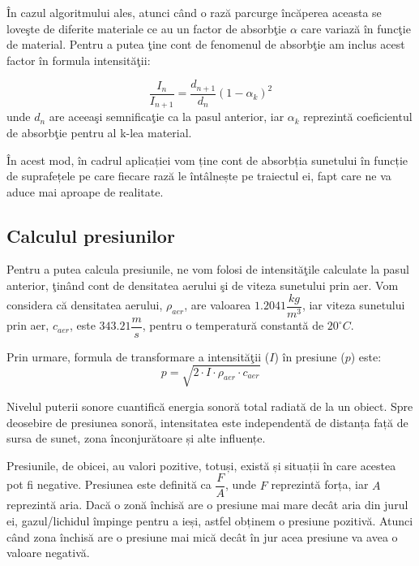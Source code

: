	
	\^{I}n cazul algoritmului ales, atunci c\^{a}nd o raz\u{a} parcurge \^{i}nc\u{a}perea aceasta se love\c{s}te de diferite materiale ce au un factor de absorb\c{t}ie $\alpha$ care variaz\u{a} \^{i}n func\c{t}ie de material. Pentru a putea \c{t}ine cont de fenomenul de absorb\c{t}ie am inclus acest factor \^{i}n formula intensit\u{a}\c{t}ii:
	
	\begin{equation}
		\frac{I_n}{I_{n+1}} = \frac{d_{n+1}}{d_n}(1-\alpha_k)^2
	\end{equation}
	unde $d_n$ are aceea\c{s}i semnifica\c{t}ie ca la pasul anterior, iar $\alpha_k$ reprezint\u{a} coeficientul de absorb\c{t}ie pentru al k-lea material.
	
	În acest mod, în cadrul aplicației vom ține cont de absorbția sunetului în funcție de suprafețele pe care fiecare rază le întâlnește pe traiectul ei, fapt care ne va aduce mai aproape de realitate.

\subsection{Calculul presiunilor}

	Pentru a putea calcula presiunile, ne vom folosi de intensit\u{a}\c{t}ile calculate la pasul anterior, \c{t}in\^{a}nd cont de densitatea aerului \c{s}i de viteza sunetului prin aer. Vom considera c\u{a} densitatea aerului, $\rho_{aer}$, are valoarea $1.2041\dfrac{kg}{m^3}$, iar viteza sunetului prin aer, $c_{aer}$, este $343.21\dfrac{m}{s}$, pentru o temperatur\u{a} constant\u{a} de $20^{\circ}C$.
	 
	
	Prin urmare, formula de transformare a intensit\u{a}\c{t}ii ($I$) \^{i}n presiune ($p$) este:
	\begin{equation}
		p = \sqrt{2 \cdot I\cdot \rho_{aer} \cdot c_{aer}}
	\end{equation}
	 
	
	Nivelul puterii sonore cuantifică energia sonoră total radiată de la un obiect.
	Spre deosebire de presiunea sonoră, intensitatea este independentă de distanța față de sursa de sunet, zona înconjurătoare și alte influențe.
	
	Presiunile, de obicei, au valori pozitive, totuși, există și situații în care acestea pot fi negative. Presiunea este definită ca $\dfrac{F}{A}$, unde $F$ reprezintă forța, iar $A$ reprezintă aria. Dacă o zonă închisă are o presiune mai mare decât aria din jurul ei, gazul/lichidul împinge pentru a ieși, astfel obținem o presiune pozitivă. Atunci când zona închisă are o presiune mai mică decât în jur acea presiune va avea o valoare negativă.

